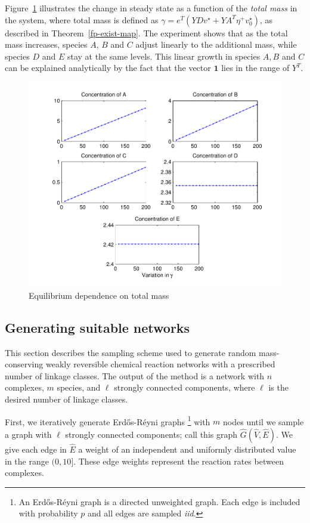 \documentclass[smallextended]{svjour3}       %
\newcounter{sent}
\newcommand*{\0}{\mathbf{0}}
\newcommand*{\1}{\mathbf{1}}
\begin{document}
Figure~\ref{EquilibriumVsTotalMass} illustrates the change in steady state as a
function of the \emph{total mass} in the system, where total mass is defined as
$\gamma = e^T(YD v^\star + YA^T \eta^+ v^\star_0)$, as described in
Theorem~\ref{fp-exist-map}.  The experiment shows that as the total mass increases,
species $A$, $B$ and $C$ adjust linearly to the additional mass, while species
$D$ and $E$ stay at the same levels.  This linear growth in species $A, B$ and
$C$ can be explained analytically by the fact that the vector $\mathbf{1}$ lies
in the range of $Y^{T}$. 

\begin{figure}%
   \sidecaption
   \includegraphics[width=4.5in]{EquilibriumVsTotalMassExample}
   \caption{Equilibrium dependence on total mass} 
   \label{EquilibriumVsTotalMass}
\end{figure}

\subsection{Generating suitable networks}

This section describes the sampling scheme used to generate random mass-conserving
weakly reversible chemical reaction networks with a prescribed number of
linkage classes.  The output of the method is a network with $n$
complexes, $m$ species, and $\ell$ strongly connected components, where $\ell$
is the desired number of linkage classes.

First, we iteratively generate Erd\H{o}s-R\'{e}yni graphs%
\footnote{An Erd\H{o}s-R\'{e}yni graph is a directed unweighted graph. Each
edge is included with probability $p$ and all edges are sampled \emph{iid}.} %
with $m$ nodes until we sample a graph with $\ell$ strongly connected
components; call this graph $\hat G( \hat V, \hat E)$.  We give each edge in 
$\hat E$ a weight of an independent and uniformly distributed value in the
range $(0,10]$.  These edge weights represent the reaction rates between
complexes.
\end{document}
